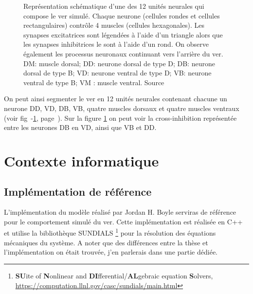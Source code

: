 \begin{figure}[ht]
   \begin{center}
   \end{center}
   \caption[Représentation d'une unité neural de \celeg{}]{Représentation
   schématique d'une des 12 unités neurales qui compose le ver simulé. Chaque
   neurone (cellules rondes et cellules rectangulaires) contrôle 4 muscles
   (cellules hexagonales).  Les synapses excitatrices sont légendées à l'aide
   d'un triangle alors que les synapses inhibitrices le sont à l'aide d'un
   rond.  On observe également les processus neuronaux continuant vers
   l'arrière du ver.  DM: muscle dorsal; DD: neurone dorsal de type D; DB:
   neurone dorsal de type B; VD: neurone ventral de type D; VB: neurone ventral
   de type B; VM : muscle ventral.  Source \boylecite{}}
   \label{fig:celegans_segment}
\end{figure}

On peut ainsi segmenter le ver en 12 unités neurales contenant chacune un neurone DD, VD,
DB, VB, quatre muscles dorsaux et quatre muscles ventraux (voir fig~-\ref{fig:celegans_segment},
page~\pageref{fig:celegans_segment}). Sur la figure \ref{fig:celegans_segment} on peut voir la
cross-inhibition représentée entre les neurones DB en VD, ainsi que VB et DD.



\section{Contexte informatique} %
\label{sec:Contexte informatique}

\subsection{Implémentation de référence} %
\label{sub:implémentation de référence}

L'implémentation du modèle réalisé par Jordan H. Boyle serviras de référence
pour le comportement simulé du ver. Cette implémentation est réalisée en C++ et
utilise la bibliothèque SUNDIALS \footnote{\textbf{SU}ite of \textbf{N}onlinear and
\textbf{DI}fferential/\textbf{AL}gebraic equation \textbf{S}olvers,
\url{https://computation.llnl.gov/casc/sundials/main.html}} pour la résolution
des équations mécaniques du système. A noter que des différences entre la thèse
et l'implémentation on était trouvée, j'en parlerais dans une partie dédiée.

